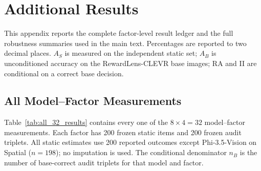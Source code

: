 \section{Additional Results}
\label{app:additional-results}

This appendix reports the complete factor-level result ledger and the full
robustness summaries used in the main text. Percentages are reported to two
decimal places. $A_S$ is measured on the independent static set; $A_B$ is
unconditioned accuracy on the RewardLens-CLEVR base images; RA and II are
conditional on a correct base decision.

\FloatBarrier

\subsection{All Model--Factor Measurements}
\label{app:all-model-factor-results}

Table~\ref{tab:all_32_results} contains every one of the $8\times4=32$
model--factor measurements. Each factor has 200 frozen static items and 200
frozen audit triplets. All static estimates use 200 reported outcomes except
Phi-3.5-Vision on Spatial ($n=198$); no imputation is used. The conditional
denominator $n_B$ is the number of base-correct audit triplets for that model
and factor.

